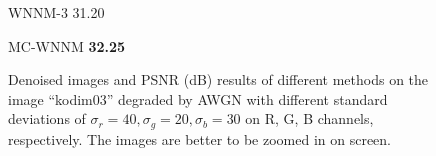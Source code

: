 \begin{figure}
{\begin{minipage}[t]{0.19\textwidth}
{\footnotesize WNNM-3 31.20}
\end{minipage}
\begin{minipage}[t]{0.19\textwidth}
\centering
{}
{\footnotesize MC-WNNM \textbf{32.25}}
\end{minipage}
}
\caption{Denoised images and PSNR (dB) results of different methods on the image ``kodim03'' degraded by AWGN with different standard deviations of $\sigma_{r}=40, \sigma_{g}=20, \sigma_{b}=30$ on R, G, B channels, respectively. The images are better to be zoomed in on screen.}
    \label{fig4-3}
\end{figure}

